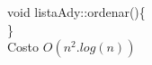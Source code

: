 \documentclass[a4paper]{article}
\begin{document}
\begin{algorithm}[h!]
void listaAdy::ordenar()\{\\
\}\\
Costo $O(n^2.log(n))$
\end{algorithm}

\newpage












\end{document}
